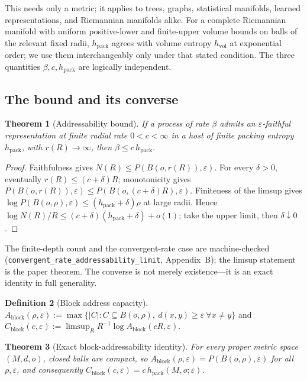 \documentclass[11pt,reqno]{amsart}
\theoremstyle{plain}
\newtheorem{theorem}{Theorem}[section]
\theoremstyle{definition}
\newtheorem{definition}[theorem]{Definition}
\newcommand{\hpack}{h_{\mathrm{pack}}}
\newcommand{\hvol}{h_{\mathrm{vol}}}
\newcommand{\Cblock}{C_{\mathrm{block}}}
\newcommand{\eps}{\varepsilon}
\begin{document}
This needs only a metric; it applies to trees, graphs, statistical manifolds, learned representations, and Riemannian manifolds alike. For a complete Riemannian manifold with uniform positive-lower and finite-upper volume bounds on balls of the relevant fixed radii, $\hpack$ agrees with volume entropy $\hvol$ at exponential order; we use them interchangeably only under that stated condition. The three quantities $\beta,c,\hpack$ are logically independent.

\subsection{The bound and its converse}

\begin{theorem}[Addressability bound]\label{thm:bound}
If a process of rate $\beta$ admits an $\eps$-faithful representation at finite radial rate $0<c<\infty$ in a host of finite packing entropy $\hpack$, with $r(R)\to\infty$, then $\beta\le c\,\hpack$.
\end{theorem}

\begin{proof}
Faithfulness gives $N(R)\le P(B(o,r(R)),\eps)$. For every $\delta>0$, eventually $r(R)\le(c+\delta)R$; monotonicity gives $P(B(o,r(R)),\eps)\le P(B(o,(c+\delta)R),\eps)$. Finiteness of the limsup gives $\log P(B(o,\rho),\eps)\le(\hpack+\delta)\rho$ at large radii. Hence $\log N(R)/R\le(c+\delta)(\hpack+\delta)+o(1)$; take the upper limit, then $\delta\downarrow0$.
\end{proof}

The finite-depth count and the convergent-rate case are machine-checked (\texttt{convergent\_rate\_addressability\_limit}, Appendix~B); the limsup statement is the paper theorem. The converse is not merely existence---it is an exact identity in full generality.

\begin{definition}[Block address capacity]
$A_{\mathrm{block}}(\rho,\eps):=\max\{|C|:C\subseteq B(o,\rho),\ d(x,y)\ge\eps\ \forall x\ne y\}$ and $\Cblock(c,\eps):=\limsup_R R^{-1}\log A_{\mathrm{block}}(cR,\eps)$.
\end{definition}

\begin{theorem}[Exact block-addressability identity]\label{thm:block}
For every proper metric space $(M,d,o)$, closed balls are compact, so $A_{\mathrm{block}}(\rho,\eps)=P(B(o,\rho),\eps)$ for all $\rho,\eps$, and consequently $\Cblock(c,\eps)=c\,\hpack(M,o;\eps)$.
\end{theorem}
\end{document}
